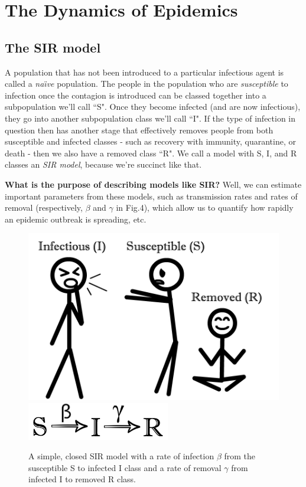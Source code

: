 \documentclass{scrartcl}
\begin{document}
\section{The Dynamics of Epidemics}

\subsection{The SIR model}

A population that has not been introduced to a particular infectious agent is called a \textit{na\"\i ve} population.  The people in the population who are 
\textit{susceptible} to infection once the contagion is introduced can be classed together into a subpopulation we'll call ``S".  Once they become 
infected (and are now infectious), they go into another subpopulation class we'll call ``I".  If the type of infection in question then has 
another stage that effectively removes people from both susceptible and infected classes - such as recovery with immunity, quarantine, or death - 
then we also have a removed class ``R".  We call a model with S, I, and R classes an \textit{SIR model}, because we're succinct like that. 

\vspace{3mm}
\textbf{What is the purpose of describing models like SIR?}  Well, we can estimate important parameters from these models, such as transmission rates and rates of removal 
(respectively, $\beta$ and $\gamma$ in Fig.4), which allow us to quantify how rapidly an epidemic outbreak is spreading, etc.

\begin{figure}[H] 
\center
\quad
{\includegraphics[width=0.4\linewidth]{SIR.jpg}}
\quad
{\includegraphics[width=0.25\linewidth]{SIRgraphic.jpg}}
\caption{A simple, closed SIR model with a rate of infection $\beta$ from the susceptible S to infected I class and a rate of removal $\gamma$ from infected I to removed R class.}
\label{sequences}
\end{figure}
\end{document}
